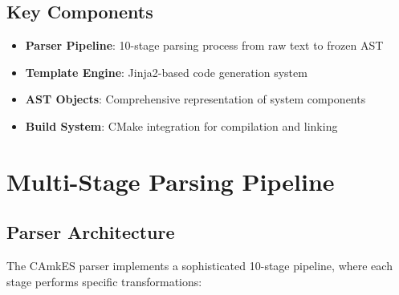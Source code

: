 \documentclass[12pt,a4paper]{article}
\begin{document}
\subsection{Key Components}
\begin{itemize}
    \item \textbf{Parser Pipeline}: 10-stage parsing process from raw text to frozen AST
    \item \textbf{Template Engine}: Jinja2-based code generation system
    \item \textbf{AST Objects}: Comprehensive representation of system components
    \item \textbf{Build System}: CMake integration for compilation and linking
\end{itemize}

\section{Multi-Stage Parsing Pipeline}

\subsection{Parser Architecture}

The CAmkES parser implements a sophisticated 10-stage pipeline, where each stage performs specific transformations:
\end{document}
